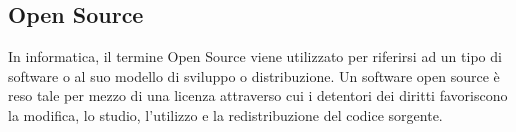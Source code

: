 
\subsection*{Open Source}
In informatica, il termine Open Source viene utilizzato per riferirsi ad un tipo di software o al suo modello di sviluppo o distribuzione. Un software open source è reso tale per mezzo di una licenza attraverso cui i detentori dei diritti favoriscono la modifica, lo studio, l'utilizzo e la redistribuzione del codice sorgente.

